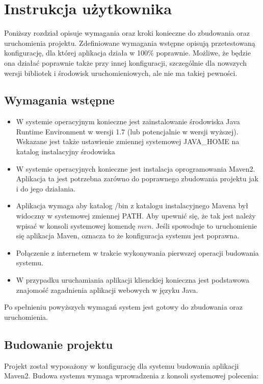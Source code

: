 \chapter{Instrukcja użytkownika}

Poniższy rozdział opisuje wymagania oraz kroki konieczne do zbudowania oraz uruchomienia projektu.
Zdefiniowane wymagania wstępne opisują przetestowaną konfigurację, dla której aplikacja działa w 100\% poprawnie.
Możliwe, że będzie ona działać poprawnie także przy innej konfiguracji, szczególnie dla nowszych wersji bibliotek i środowisk uruchomieniowych, ale nie ma takiej pewności.

\section{Wymagania wstępne}

\begin{itemize}
	\item W systemie operacyjnym konieczne jest zainstalowanie środowiska Java Runtime Environment w wersji 1.7 (lub potencjalnie w wersji wyższej). 
	Wskazane jest także ustawienie zmiennej systemowej JAVA\_HOME na katalog instalacyjny środowiska
	\item W systemie operacyjnych konieczne jest instalacja oprogramowania Maven2.
	Aplikacja ta jest potrzebna zarówno do poprawnego zbudowania projektu jak i do jego działania.
	\item Aplikacja wymaga aby katalog /bin z katalogu instalacyjnego Mavena był widoczny w systemowej zmiennej PATH.
	Aby upewnić się, że tak jest należy wpisać w konsoli systemowej komendę $mvn$. 
	Jeśli spowoduje to uruchomienie się aplikacja Maven, oznacza to że konfiguracja systemu jest poprawna.
	\item Połączenie z internetem w trakcie wykonywania pierwszej operacji budowania systemu.
	\item W przypadku uruchamiania aplikacji klienckiej konieczna jest podstawowa znajomość zagadnienia aplikacji webowych w języku Java.
 \end{itemize}
 
 Po spełnieniu powyższych wymagań system jest gotowy do zbudowania oraz uruchomienia.

\section{Budowanie projektu}

Projekt został wyposażony w konfigurację dla systemu budowania aplikacji Maven2.
Budowa systemu wymaga wprowadzenia z konsoli systemowej polecenia:

